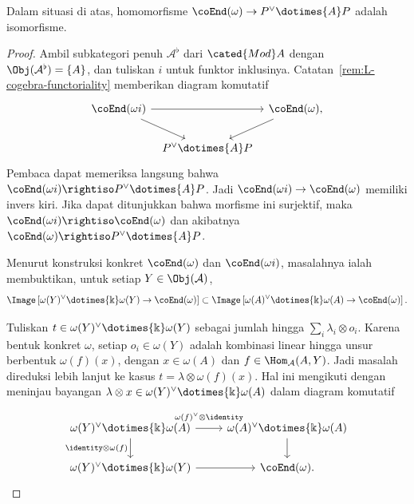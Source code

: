 \begin{proposition}\label{prop:endomorphism-vs-P}
	Dalam situasi di atas, homomorfisme
	$\coEnd(\omega)\to P^\vee\dotimes{A}P$ adalah isomorfisme.
\end{proposition}
\begin{proof}
	Ambil subkategori penuh $\mathcal{A}^\flat$ dari $\cated{Mod}A$ dengan
	$\Obj(\mathcal{A}^\flat)=\{A\}$, dan tuliskan $i$ untuk funktor
	inklusinya. Catatan~\ref{rem:L-cogebra-functoriality} memberikan diagram
	komutatif
	\[\begin{tikzcd}[column sep=tiny]
		\coEnd(\omega i) \arrow[rr] \arrow[rd] & & \coEnd(\omega), \arrow[ld] \\
		& P^\vee \dotimes{A} P &
	\end{tikzcd}\]
	Pembaca dapat memeriksa langsung bahwa
	$\coEnd(\omega i)\rightiso P^\vee\dotimes{A}P$. Jadi
	$\coEnd(\omega i)\to\coEnd(\omega)$ memiliki invers kiri. Jika dapat
	ditunjukkan bahwa morfisme ini surjektif, maka
	$\coEnd(\omega i)\rightiso\coEnd(\omega)$ dan akibatnya
	$\coEnd(\omega)\rightiso P^\vee\dotimes{A}P$.

	Menurut konstruksi konkret $\coEnd(\omega)$ dan $\coEnd(\omega i)$,
	masalahnya ialah membuktikan, untuk setiap $Y\in\Obj(\mathcal{A})$,
	\[ \Image\left[ \omega(Y)^\vee \dotimes{\Bbbk} \omega(Y) \to \coEnd(\omega) \right] \subset \Image\left[ \omega(A)^\vee \dotimes{\Bbbk} \omega(A) \to \coEnd(\omega) \right]. \]

	Tuliskan $t\in\omega(Y)^\vee\dotimes{\Bbbk}\omega(Y)$ sebagai jumlah
	hingga $\sum_i\lambda_i\otimes o_i$. Karena bentuk konkret $\omega$,
	setiap $o_i\in\omega(Y)$ adalah kombinasi linear hingga unsur berbentuk
	$\omega(f)(x)$, dengan $x\in\omega(A)$ dan
	$f\in\Hom_{\mathcal{A}}(A,Y)$. Jadi masalah direduksi lebih lanjut ke
	kasus $t=\lambda\otimes\omega(f)(x)$. Hal ini mengikuti dengan meninjau
	bayangan $\lambda\otimes x\in
	\omega(Y)^\vee\dotimes{\Bbbk}\omega(A)$ dalam diagram komutatif
	\[\begin{tikzcd}
		\omega(Y)^\vee \dotimes{\Bbbk} \omega(A) \arrow[r, "{\omega(f)^\vee \otimes \identity}" inner sep=0.6em] \arrow[d, "{\identity \otimes \omega(f)}"'] & \omega(A)^\vee \dotimes{\Bbbk} \omega(A) \arrow[d] \\
		\omega(Y)^\vee \dotimes{\Bbbk}  \omega(Y) \arrow[r] & \coEnd(\omega).
	\end{tikzcd}\]
\end{proof}

